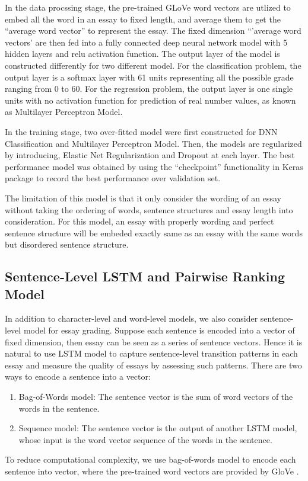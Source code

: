 \documentclass[10pt,psamsfonts]{amsart}
\theoremstyle{definition}
\theoremstyle{remark}
\numberwithin{equation}{section}
\begin{document}
In the data procssing stage, the pre-trained GLoVe word vectors are utlized to embed all the word in an essay to fixed length, and average them to get the ``average word vector'' to represent the essay. The fixed dimension ``'average word vectors' are then fed into a fully connected deep neural network model with 5 hidden layers and relu activation function. The output layer of the model is constructed differently for two different model. For the classification problem, the output layer is a softmax layer with 61 units representing all the possible grade ranging from 0 to 60. For the regression problem, the output layer is one single units with no activation function for prediction of real number values, as known as Multilayer Perceptron Model. 

In the training stage, two over-fitted model were first constructed for DNN Classification and Multilayer Perceptron Model. Then, the models are regularized by introducing, Elastic Net Regularization and Dropout at each layer. The best performance model was obtained by using the ``checkpoint'' functionality in Keras package to record the best performance over validation set. 

The limitation of this model is that it only consider the wording of an essay without taking the ordering of words, sentence structures and essay length into consideration. For this model, an essay with properly wording and perfect sentence structure will be embeded exactly same as an essay with the same words but disordered sentence structure. 

\subsection*{Sentence-Level LSTM and Pairwise Ranking Model}

In addition to character-level and word-level models, we also consider sentence-level model for essay grading. Suppose each sentence is encoded into a vector of fixed dimension, then essay can be seen as a series of sentence vectors. Hence it is natural to use LSTM model to capture sentence-level transition patterns in each essay and measure the quality of essays by assessing such patterns. There are two ways to encode a sentence into a vector:
\begin{enumerate}
\item Bag-of-Words model: The sentence vector is the sum of word vectors of the words in the sentence.
\item Sequence model: The sentence vector is the output of another LSTM model, whose input is the word vector sequence of the words in the sentence. 
\end{enumerate}
To reduce computational complexity, we use bag-of-words model to encode each sentence into vector, where the pre-trained word vectors are provided by GloVe \cite{glove}.
\end{document}
